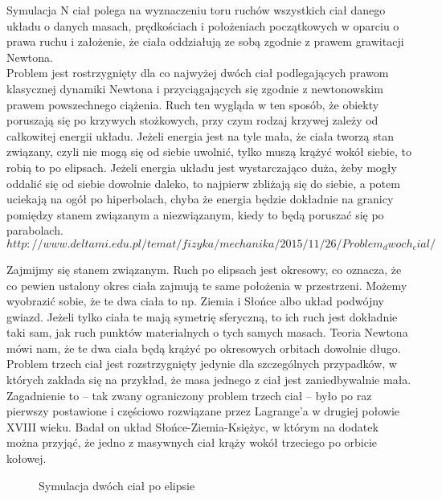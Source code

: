 \documentclass[13pt,twoside,a4paper]{article}
\begin{document}
Symulacja N ciał polega na wyznaczeniu toru ruchów wszystkich ciał danego układu o danych masach, prędkościach i położeniach początkowych w oparciu o prawa ruchu i założenie, że ciała oddziałują ze sobą zgodnie z prawem grawitacji Newtona. \\

Problem jest rostrzygnięty dla co najwyżej dwóch ciał podlegających prawom klasycznej dynamiki Newtona i przyciągających się zgodnie z newtonowskim prawem powszechnego ciążenia. Ruch ten wygląda w ten sposób, że obiekty poruszają się po krzywych stożkowych, przy czym rodzaj krzywej zależy od całkowitej energii układu. Jeżeli energia jest na tyle mała, że ciała tworzą stan związany, czyli nie mogą się od siebie uwolnić, tylko muszą krążyć wokół siebie, to robią to po elipsach. Jeżeli energia układu jest wystarczająco duża, żeby mogły oddalić się od siebie dowolnie daleko, to najpierw zbliżają się do siebie, a potem uciekają na ogół po hiperbolach, chyba że energia będzie dokładnie na granicy pomiędzy stanem związanym a niezwiązanym, kiedy to będą poruszać się po parabolach.\\
$http://www.deltami.edu.pl/temat/fizyka/mechanika/2015/11/26/Problem_dwoch_cial/$

Zajmijmy się stanem związanym. Ruch po elipsach jest okresowy, co oznacza, że co pewien ustalony okres ciała zajmują te same położenia w przestrzeni. Możemy wyobrazić sobie, że te dwa ciała to np. Ziemia i Słońce albo układ podwójny gwiazd. Jeżeli tylko ciała te mają symetrię sferyczną, to ich ruch jest dokładnie taki sam, jak ruch punktów materialnych o tych samych masach. Teoria Newtona mówi nam, że te dwa ciała będą krążyć po okresowych orbitach dowolnie długo.\\

Problem trzech ciał jest rozstrzygnięty jedynie dla szczególnych przypadków, w których zakłada się na przykład, że masa jednego z ciał jest zaniedbywalnie mała. Zagadnienie to – tak zwany ograniczony problem trzech ciał – było po raz pierwszy postawione i częściowo rozwiązane przez Lagrange'a w drugiej połowie XVIII wieku. Badał on układ Słońce-Ziemia-Księżyc, w którym na dodatek można przyjąć, że jedno z masywnych ciał krąży wokół trzeciego po orbicie kołowej. 


\newpage

\begin{figure}
    \centering
    \def\svgwidth{\columnwidth}
    
    \caption{Symulacja dwóch ciał po elipsie}
\end{figure}
\end{document}
